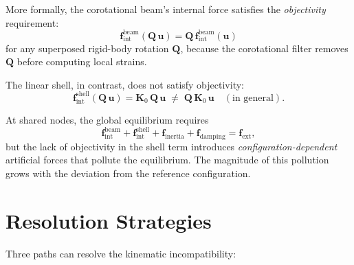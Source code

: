 More formally, the corotational beam's internal force satisfies the
\emph{objectivity} requirement:
\begin{equation}\label{eq:objectivity}
  \mathbf{f}_\mathrm{int}^\mathrm{beam}(\mathbf{Q}\,\mathbf{u})
  = \mathbf{Q} \, \mathbf{f}_\mathrm{int}^\mathrm{beam}(\mathbf{u})
\end{equation}
for any superposed rigid-body rotation $\mathbf{Q}$, because the
corotational filter removes $\mathbf{Q}$ before computing local strains.

The linear shell, in contrast, does not satisfy objectivity:
\begin{equation}
  \mathbf{f}_\mathrm{int}^\mathrm{shell}(\mathbf{Q}\,\mathbf{u})
  = \mathbf{K}_0 \, \mathbf{Q} \, \mathbf{u}
  \;\neq\;
  \mathbf{Q} \, \mathbf{K}_0 \, \mathbf{u}
  \quad (\text{in general}).
\end{equation}

At shared nodes, the global equilibrium requires
\begin{equation}
  \mathbf{f}_\mathrm{int}^\mathrm{beam}
  + \mathbf{f}_\mathrm{int}^\mathrm{shell}
  + \mathbf{f}_\mathrm{inertia}
  + \mathbf{f}_\mathrm{damping}
  = \mathbf{f}_\mathrm{ext},
\end{equation}
but the lack of objectivity in the shell term introduces
\emph{configuration-dependent} artificial forces that pollute the
equilibrium.  The magnitude of this pollution grows with the deviation
from the reference configuration.


\section{Resolution Strategies}
\label{sec:resolution-strategies}

Three paths can resolve the kinematic incompatibility:

